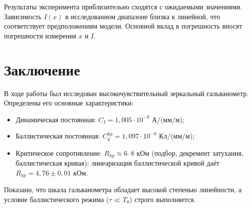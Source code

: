 \documentclass[a4paper,12pt]{article}
\begin{document}
Результаты эксперимента приблизительно сходятся с ожидаемыми значениями. Зависимость $I(x)$ в исследованном диапазоне близка к линейной, что соответствует предположениям модели. Основной вклад в погрешность вносят погрешности измерения $x$ и $I$.

\section{Заключение}
В ходе работы был исследован высокочувствительный зеркальный гальванометр. 
Определены его основные характеристики:
\begin{itemize}
    \item Динамическая постоянная: $C_I = 1,005\cdot10^{-9}$ А/(мм/м);
    \item Баллистическая постоянная: $C_q^{kp} = 1,097\cdot10^{-9}$ Кл/(мм/м);
    \item Критическое сопротивление: $R_{kp} \approx 6$--$8$ кОм (подбор, декремент затухания, баллистическая кривая); линеаризация баллистической кривой даёт $R_{kp} = 4,76 \pm 0,01$ кОм.
\end{itemize}
Показано, что шкала гальванометра обладает высокой степенью линейности, а условие баллистического режима ($\tau \ll T_0$) строго выполняется.
\end{document}
